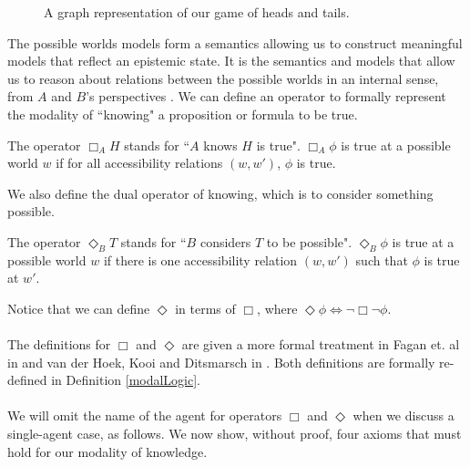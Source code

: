 \begin{figure}[ht!]
\centering
{}
\caption{A graph representation of our game of heads and tails.}\label{htkripkefigure}
\end{figure}

The possible worlds models form a semantics allowing us to construct meaningful
models that reflect an epistemic state.
It is the semantics and models that allow us to reason about relations between the possible worlds in
an internal sense, from $A$ and $B$'s perspectives \cite{blackburn2002modal}.
We can define an operator to formally represent the modality of ``knowing"
a proposition or formula to be true.

\begin{defn}
	The operator $\Box_A H$ stands for ``$A$ knows $H$ is true".
	$\Box_A \phi$ is true at a possible world $w$ if for all accessibility relations $(w,
	w')$, $\phi$ is true.
\end{defn}

We also define the dual operator of knowing, which is to consider something
possible.

\begin{defn}
	The operator $\Diamond_B T$ stands for ``$B$ considers $T$ to be possible".
	$\Diamond_B \phi$ is true at a possible world $w$ if there is one
	accessibility relation $(w,w')$ such that $\phi$ is true at $w'$.
\end{defn}

Notice that we can define $\Diamond$ in terms of $\Box$, where $\Diamond
\phi \iff \neg \Box \neg \phi$.\\
\\
The definitions for $\Box$ and $\Diamond$ are given a more formal treatment in
Fagan et. al in \cite{fagin1995reasoning} and van der Hoek, Kooi and Ditsmarsch in
\cite{hoek2008dynamic}.
Both definitions are formally re-defined in Definition \ref{modalLogic}.\\
\\
We will omit the name of the agent for operators $\Box$ and $\Diamond$ when we
discuss a single-agent case, as follows.
We now show, without proof, four axioms that must hold for our modality of
knowledge.

